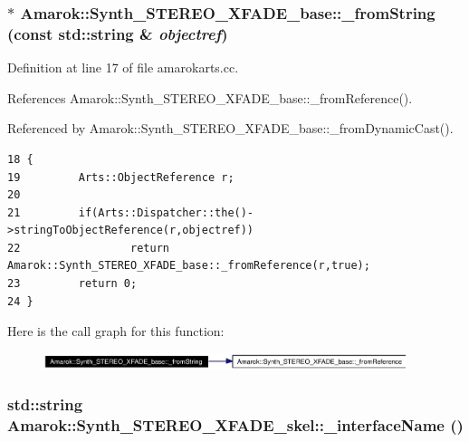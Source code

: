 \subsubsection{ $\ast$ Amarok::Synth\_\-STEREO\_\-XFADE\_\-base::\_\-from\-String (const std::string \& {\em objectref})\hspace{0.3cm}{\tt  [static, inherited]}}\label{classAmarok_1_1Synth__STEREO__XFADE__base_Amarok_1_1Synth__STEREO__XFADE__stube1}




Definition at line 17 of file amarokarts.cc.

References Amarok::Synth\_\-STEREO\_\-XFADE\_\-base::\_\-from\-Reference().

Referenced by Amarok::Synth\_\-STEREO\_\-XFADE\_\-base::\_\-from\-Dynamic\-Cast().



\footnotesize\begin{verbatim}18 {
19         Arts::ObjectReference r;
20 
21         if(Arts::Dispatcher::the()->stringToObjectReference(r,objectref))
22                 return Amarok::Synth_STEREO_XFADE_base::_fromReference(r,true);
23         return 0;
24 }
\end{verbatim}\normalsize 


Here is the call graph for this function:\begin{figure}[H]
\begin{center}
\leavevmode
\includegraphics[width=300pt]{classAmarok_1_1Synth__STEREO__XFADE__base_Amarok_1_1Synth__STEREO__XFADE__stube1_cgraph}
\end{center}
\end{figure}
\subsubsection{\setlength{\rightskip}{0pt plus 5cm}std::string Amarok::Synth\_\-STEREO\_\-XFADE\_\-skel::\_\-interface\-Name ()}\label{classAmarok_1_1Synth__STEREO__XFADE__skel_Amarok_1_1Synth__STEREO__XFADE__skela1}




